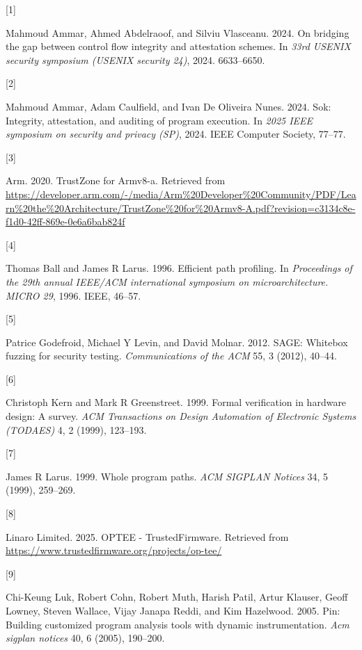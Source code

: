 \documentclass[a4paper, nobind]{templates/ociamthesis}
\newlength{\cslhangindent}
\newlength{\csllabelwidth}
\newenvironment{CSLReferences}[2] %
{\begin{list}{}{%
	\setlength{\itemindent}{0pt}
	\setlength{\leftmargin}{0pt}
	\setlength{\parsep}{0pt}
	\ifodd #1
	\setlength{\leftmargin}{\cslhangindent}
	\setlength{\itemindent}{-1\cslhangindent}
	\fi
	\setlength{\itemsep}{#2\baselineskip}}}
{\end{list}}
\newcommand{\CSLLeftMargin}[1]{\parbox[t]{\csllabelwidth}{\strut#1\strut}}
\newcommand{\CSLRightInline}[1]{\parbox[t]{\linewidth - \csllabelwidth}{\strut#1\strut}}
\begin{document}
\label{refs}
\begin{CSLReferences}{0}{0}
\CSLLeftMargin{{[}1{]} }%
\CSLRightInline{Mahmoud Ammar, Ahmed Abdelraoof, and Silviu Vlasceanu. 2024. On bridging the gap between control flow integrity and attestation schemes. In \emph{33rd USENIX security symposium (USENIX security 24)}, 2024. 6633--6650.}

\CSLLeftMargin{{[}2{]} }%
\CSLRightInline{Mahmoud Ammar, Adam Caulfield, and Ivan De Oliveira Nunes. 2024. Sok: Integrity, attestation, and auditing of program execution. In \emph{2025 IEEE symposium on security and privacy (SP)}, 2024. IEEE Computer Society, 77--77.}

\CSLLeftMargin{{[}3{]} }%
\CSLRightInline{Arm. 2020. TrustZone for Armv8-a. Retrieved from \url{https://developer.arm.com/-/media/Arm\%20Developer\%20Community/PDF/Learn\%20the\%20Architecture/TrustZone\%20for\%20Armv8-A.pdf?revision=c3134c8e-f1d0-42ff-869e-0e6a6bab824f}}

\CSLLeftMargin{{[}4{]} }%
\CSLRightInline{Thomas Ball and James R Larus. 1996. Efficient path profiling. In \emph{Proceedings of the 29th annual IEEE/ACM international symposium on microarchitecture. MICRO 29}, 1996. IEEE, 46--57.}

\CSLLeftMargin{{[}5{]} }%
\CSLRightInline{Patrice Godefroid, Michael Y Levin, and David Molnar. 2012. SAGE: Whitebox fuzzing for security testing. \emph{Communications of the ACM} 55, 3 (2012), 40--44.}

\CSLLeftMargin{{[}6{]} }%
\CSLRightInline{Christoph Kern and Mark R Greenstreet. 1999. Formal verification in hardware design: A survey. \emph{ACM Transactions on Design Automation of Electronic Systems (TODAES)} 4, 2 (1999), 123--193.}

\CSLLeftMargin{{[}7{]} }%
\CSLRightInline{James R Larus. 1999. Whole program paths. \emph{ACM SIGPLAN Notices} 34, 5 (1999), 259--269.}

\CSLLeftMargin{{[}8{]} }%
\CSLRightInline{Linaro Limited. 2025. OPTEE - TrustedFirmware. Retrieved from \url{https://www.trustedfirmware.org/projects/op-tee/}}

\CSLLeftMargin{{[}9{]} }%
\CSLRightInline{Chi-Keung Luk, Robert Cohn, Robert Muth, Harish Patil, Artur Klauser, Geoff Lowney, Steven Wallace, Vijay Janapa Reddi, and Kim Hazelwood. 2005. Pin: Building customized program analysis tools with dynamic instrumentation. \emph{Acm sigplan notices} 40, 6 (2005), 190--200.}


\end{CSLReferences}
\end{document}
